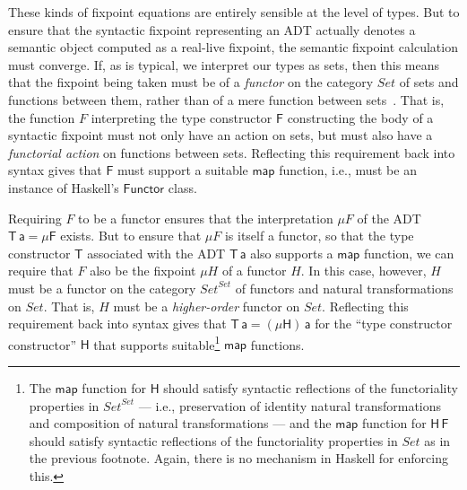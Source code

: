 \documentclass[acmsmall,screen,review,anonymous]{acmart}
\theoremstyle{definition}
\begin{document}
These kinds of fixpoint equations are entirely sensible at the level
of types. But to ensure that the syntactic fixpoint representing an
ADT actually denotes a semantic object computed as a real-live
fixpoint, the semantic fixpoint calculation must converge.  If, as is
typical, we interpret our types as sets, then this means that the
fixpoint being taken must be of a {\em functor} on the category
$\mathit{Set}$ of sets and functions between them, rather than of a
mere function between sets~\cite{tfca}.  That is, the function $F$
interpreting the type constructor $\mathsf{F}$ constructing the body
of a syntactic fixpoint must not only have an action on sets, but must
also have a {\em functorial action} on functions between
sets. Reflecting this requirement back into syntax gives that
$\mathsf{F}$ must support a suitable
$\mathsf{map}$ function, i.e., must be an instance of Haskell's
$\mathsf{Functor}$ class.

Requiring $F$ to be a functor ensures that the interpretation $\mu F$
of the ADT $\mathsf{T\,a} = \mathsf{\mu F}$ exists. But to ensure that
$\mu F$ is itself a functor, so that the type constructor $\mathsf{T}$
associated with the ADT $\mathsf{T\,a}$ also supports a $\mathsf{map}$
function, we can require that $F$ also be the fixpoint $\mu H$ of a
functor $H$. In this case, however, $H$ must be a functor on the
category $\mathit{Set}^\mathit{Set}$ of functors and natural
transformations on $\mathit{Set}$. That is, $H$ must be a {\em
  higher-order} functor on $\mathit{Set}$. Reflecting this requirement
back into syntax gives that $\mathsf{T\,a} = \mathsf{(\mu H)\,a}$ for
the ``type constructor constructor'' $\mathsf{H}$ that supports
suitable\footnote{The $\mathsf{map}$ function for $\mathsf{H}$ should
  satisfy syntactic reflections of the functoriality properties in
  $\mathit{Set}^\mathit{Set}$ --- i.e., preservation of identity
  natural transformations and composition of natural transformations
  --- and the $\mathsf{map}$ function for $\mathsf{H\,F}$ should
  satisfy syntactic reflections of the functoriality properties in
  $\mathit{Set}$ as in the previous footnote. Again, there is no
  mechanism in Haskell for enforcing this.} $\mathsf{map}$ functions.
\end{document}
